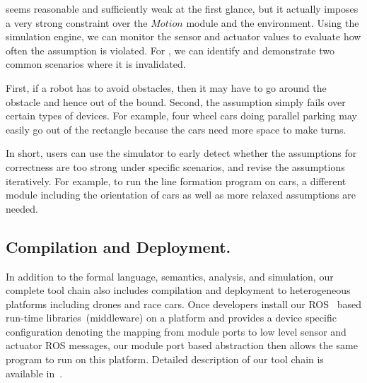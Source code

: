  seems reasonable and sufficiently weak at the first glance,
but it actually imposes a very strong constraint over the $Motion$ module and the environment.
Using the simulation engine, we can monitor the sensor and actuator values to evaluate how often the assumption is violated.
For , we can identify and demonstrate two common scenarios
where it is invalidated.

First, if a robot has to avoid obstacles,
then it may have to go around the obstacle and hence out of the bound.
Second, the assumption simply fails over certain types of devices.
For example, four wheel cars doing parallel parking may easily go out of the rectangle
because the cars need more space to make turns.

In short, users can use the simulator to early detect whether
the assumptions for correctness are too strong under specific scenarios,
and revise the assumptions iteratively.
For example, to run the line formation program on cars,
a different module including the orientation of cars as well as more relaxed assumptions are needed.

\subsection{Compilation and Deployment.}
In addition to the formal language, semantics, analysis, and simulation,
our complete tool chain also includes compilation and deployment to heterogeneous platforms including drones and race cars.
Once developers install our ROS~\cite{ros} based run-time libraries~(middleware) on a platform
and provides a device specific configuration denoting the mapping from \lgname module ports
to low level sensor and actuator ROS messages,
our module port based abstraction then allows the same \lgname program to run on this platform.
Detailed description of our tool chain is available in~\cite{ghosh2019cyphyhouse}.
